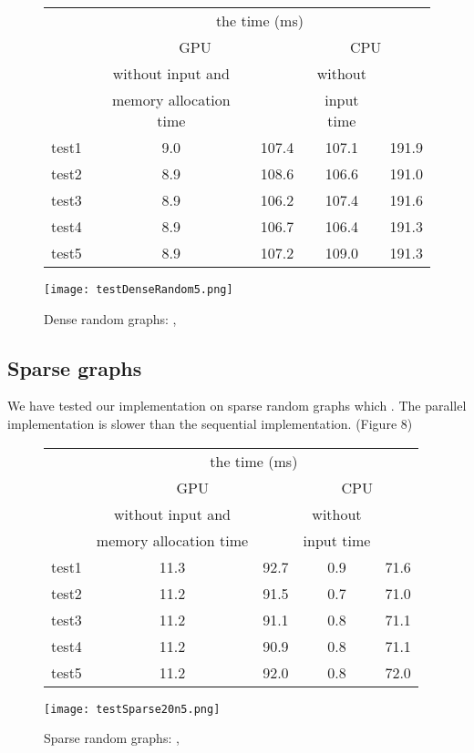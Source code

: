 \documentclass[a4paper, 11pt]{article}
\begin{document}
\begin{figure}[h!]
    \caption{Dense random graphs: , }
    \begin{center}
    \begin{tabular}{|r|c|c|c|c|}
        \hline
        & \multicolumn{4}{|c|}{the time (ms)}\\
        \cline{2-5}
        & \multicolumn{2}{|c|}{GPU} & \multicolumn{2}{|c|}{CPU}\\
        \cline{2-5}
            & without input and &  & without & \\
           & memory allocation time &  & input time & \\
        \hline
        test1 & 9.0 & 107.4 & 107.1 & 191.9\\
        test2 & 8.9 & 108.6 & 106.6 & 191.0\\
        test3 & 8.9 & 106.2 & 107.4 & 191.6\\
        test4 & 8.9 & 106.7 & 106.4 & 191.3\\
        test5 & 8.9 & 107.2 & 109.0 & 191.3\\
        \hline
    \end{tabular}
    \texttt{[image: testDenseRandom5.png]}\\
\end{center}
\end{figure}
\newpage

\subsection{Sparse graphs}

We have tested our implementation on sparse random graphs which .
The parallel implementation is slower than the sequential implementation.
(Figure 8)

\begin{figure}[h!]
    \caption{Sparse random graphs: , }
    \begin{center}
    \begin{tabular}{|r|c|c|c|c|}
        \hline
        & \multicolumn{4}{|c|}{the time (ms)}\\
        \cline{2-5}
        & \multicolumn{2}{|c|}{GPU} & \multicolumn{2}{|c|}{CPU}\\
        \cline{2-5}
            & without input and &  & without & \\
           & memory allocation time&  & input time & \\
        \hline
        test1 & 11.3 & 92.7 & 0.9 & 71.6\\
        test2 & 11.2 & 91.5 & 0.7 & 71.0\\
        test3 & 11.2 & 91.1 & 0.8 & 71.1\\
        test4 & 11.2 & 90.9 & 0.8 & 71.1\\
        test5 & 11.2 & 92.0 & 0.8 & 72.0\\
        \hline
    \end{tabular}


    \texttt{[image: testSparse20n5.png]}\\
    \end{center}
\end{figure}
\newpage
\end{document}
